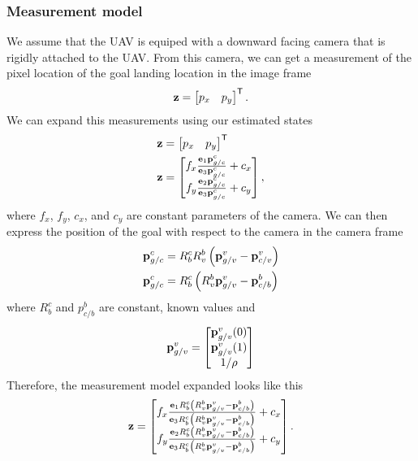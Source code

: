 \subsubsection{Measurement model}
We assume that the UAV is equiped with a downward facing camera that is rigidly
attached to the UAV. From this camera, we can get a measurement of the pixel
location of the goal landing location in the image frame
\begin{equation}
  \boldsymbol{\mathrm{z}} =
  \begin{bmatrix}
    p_x & p_y
  \end{bmatrix}^{\mathsf{T}}.
\end{equation}
We can expand this measurements using our estimated states
\begin{align}
  \boldsymbol{\mathrm{z}} &=
  \begin{bmatrix}
    p_x & p_y
  \end{bmatrix}^{\mathsf{T}} \\
  \boldsymbol{\mathrm{z}} &=
  \begin{bmatrix}
    f_x \frac{\boldsymbol{\mathrm{e}}_1 \boldsymbol{\mathrm{p}}_{g/c}^c}{\boldsymbol{\mathrm{e}}_3 \boldsymbol{\mathrm{p}}_{g/c}^c} + c_x \\
    f_y \frac{\boldsymbol{\mathrm{e}}_2 \boldsymbol{\mathrm{p}}_{g/c}^c}{\boldsymbol{\mathrm{e}}_3 \boldsymbol{\mathrm{p}}_{g/c}^c} + c_y
  \end{bmatrix},
\end{align}
where $f_x$, $f_y$, $c_x$, and $c_y$ are constant parameters of the camera. We
can then express the position of the goal with respect to the camera in the
camera frame 
\begin{align}
  \boldsymbol{\mathrm{p}}_{g/c}^c &= R_b^c R_v^b \left(\boldsymbol{\mathrm{p}}_{g/v}^v -
    \boldsymbol{\mathrm{p}}_{c/v}^v\right) \\
    \boldsymbol{\mathrm{p}}_{g/c}^c &= R_b^c \left(R_v^b \boldsymbol{\mathrm{p}}_{g/v}^v -
    \boldsymbol{\mathrm{p}}_{c/b}^b\right)
\end{align}
where $R_b^c$ and $p_{c/b}^b$ are constant, known values and
\begin{equation}
  \boldsymbol{\mathrm{p}}_{g/v}^v =
    \begin{bmatrix}
      \boldsymbol{\mathrm{p}}_{g/v}^v(0) \\
      \boldsymbol{\mathrm{p}}_{g/v}^v(1) \\
      1 / \rho
    \end{bmatrix}
\end{equation}
Therefore, the measurement model expanded looks like this
\begin{equation}
  \boldsymbol{\mathrm{z}} =
  \begin{bmatrix}
    f_x \frac{\boldsymbol{\mathrm{e}}_1 R_b^c \left(R_v^b \boldsymbol{\mathrm{p}}_{g/v}^v - \boldsymbol{\mathrm{p}}_{c/b}^b\right)}{\boldsymbol{\mathrm{e}}_3 R_b^c \left(R_v^b \boldsymbol{\mathrm{p}}_{g/v}^v - \boldsymbol{\mathrm{p}}_{c/b}^b\right)} + c_x \\
    f_y \frac{\boldsymbol{\mathrm{e}}_2 R_b^c \left(R_v^b \boldsymbol{\mathrm{p}}_{g/v}^v - \boldsymbol{\mathrm{p}}_{c/b}^b\right)}{\boldsymbol{\mathrm{e}}_3 R_b^c \left(R_v^b \boldsymbol{\mathrm{p}}_{g/v}^v - \boldsymbol{\mathrm{p}}_{c/b}^b\right)} + c_y
  \end{bmatrix}.
\end{equation}

